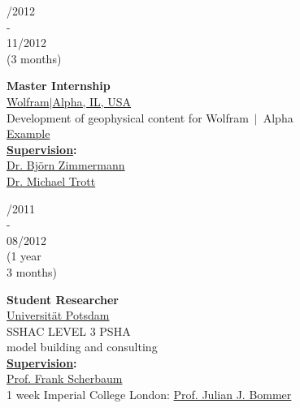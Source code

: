 \documentclass{article}
\begin{document}
\begin{minipage}[t]{0.7\textwidth}
\begin{minipage}[t]{0.45\textwidth}
		
		
		\begin{minipage}[t]{0.25\textwidth}
		/2012\\ -\\ 11/2012 \\(3 months)
		\end{minipage}		
		\hfill
		\begin{minipage}[t]{0.75\textwidth}
		\textbf{Master Internship}\\
		\href{https:///www.wolframalpha.com/}{\color{pblue}Wolfram$\mid$Alpha, IL, USA}\\
	   Development of geophysical content for Wolfram$~\mid~$Alpha\\
	    \href{https://m.wolframalpha.com/input/?i=moment+magnitude}{\color{pblue}Example}\\
	     \textbf{\underline{Supervision}:}\\
	     \href{mailto:bjornz@wolfram.com }{\color{pblue} Dr. Björn Zimmermann} \\ \href{mailto:mtrott@wolfram.com }{\color{pblue} Dr. Michael Trott} 
		\end{minipage}
		\vspace{0.3cm}
		
	\begin{minipage}[t]{0.25\textwidth}
		/2011\\ -\\ 08/2012 \\(1 year \\3 months)
		\end{minipage}
		\hfill
		\begin{minipage}[t]{0.75\textwidth}
		\textbf{Student Researcher}\\
		\href{https://www.uni-potsdam.de/}{\color{pblue}Universität Potsdam}\\
	    SSHAC LEVEL 3 PSHA\\ model building and consulting\\
	      \textbf{\underline{Supervision}:}\\
	     \href{http://www.geo.uni-potsdam.de/mitarbeiterdetails/show/96/Frank_Scherbaum.html/}{\color{pblue}Prof. Frank Scherbaum}\\
	    1 week Imperial College London: \href{https://www.imperial.ac.uk/people/j.bommer}{\color{pblue}Prof. Julian J. Bommer}
		\end{minipage}
		

\end{minipage}
\end{minipage}
\end{document}
